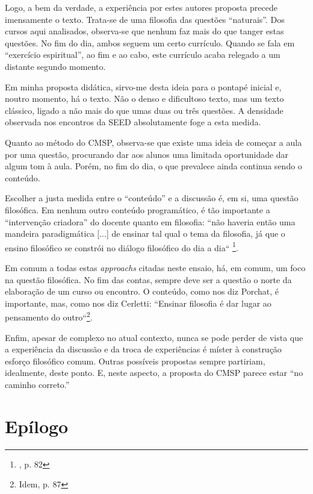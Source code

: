 \documentclass[12pt,a4paper]{article}
\begin{document}
	Logo, a bem da verdade, a experiência por estes autores proposta 
	precede imensamente o texto. Trata-se de uma filosofia das questões 
	“naturais”. Dos cursos aqui analisados, observa-se que nenhum faz 
	mais do que tanger estas questões. No fim do dia, ambos seguem um 
	certo currículo. Quando se fala em “exercício espiritual”, ao fim 
	e ao cabo, este currículo acaba relegado a um distante segundo 
	momento. 

	Em minha proposta didática, sirvo-me desta ideia para o pontapé 
	inicial e, noutro momento, há o texto. Não o denso e dificultoso 
	texto, mas um texto clássico, ligado a não mais do que umas duas 
	ou três questões. A densidade observada nos encontros da SEED 
	absolutamente foge a esta medida. 

	Quanto ao método do CMSP, observa-se que existe uma ideia de 
	começar a aula por uma questão, procurando dar aos alunos uma 
	limitada oportunidade dar algum tom à aula. Porém, no fim do dia, 
	o que prevalece ainda continua sendo o conteúdo. 

	Escolher a justa medida entre o “conteúdo” e a discussão é, em 
	si, uma questão filosófica. Em nenhum outro conteúdo programático, 
	é tão importante a “intervenção criadora” do docente quanto em 
	filosofia: “não haveria então uma mandeira paradigmática [...] de 
	ensinar tal qual o tema da filosofia, já que o ensino filosófico 
	se constrói no diálogo filosófico do dia a dia“ 
	\footnote{\cite{cerletti}, p. 82}. 

	Em comum a todas estas \textit{approachs} citadas neste ensaio, 
	há, em comum, um foco na questão filosófica. No fim das contas, 
	sempre deve ser a questão o norte da elaboração de um curso ou 
	encontro. O conteúdo, como nos diz Porchat, é importante, mas, 
	como nos diz Cerletti: “Ensinar filosofia é dar lugar ao 
	pensamento do outro“\footnote{Idem, p. 87}. 

	Enfim, apesar de complexo no atual contexto, nunca se pode 
	perder de vista que a experiência da discussão e da troca de 
	experiências é míster à construção esforço filosófico comum. 
	Outras possíveis propostas sempre partiriam, idealmente, 
	deste ponto. E, neste aspecto, a proposta do CMSP parece estar 
	“no caminho correto.”

	\newpage
	
	\section{Epílogo}
\end{document}
